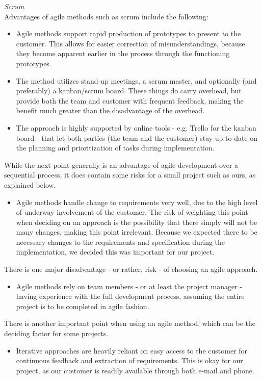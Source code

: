 \emph{Scrum} \\

Advantages of agile methods such as scrum include the following:
	\begin{itemize}
		\item Agile methods support rapid production of prototypes to present to the customer. This allows for easier correction of misunderstandings, because they become apparent earlier in the process through the functioning prototypes.
		\item The method utilizes stand-up meetings, a scrum master, and optionally (and preferably) a kanban/scrum board. These things do carry overhead, but provide both the team and customer with frequent feedback, making the benefit much greater than the disadvantage of the overhead.
		\item The approach is highly supported by online tools - e.g. Trello for the kanban board - that let both parties (the team and the customer) stay up-to-date on the planning and prioritization of tasks during implementation.
	\end{itemize}
While the next point generally is an advantage of agile development over a sequential process, it does contain some risks for a small project such as ours, as explained below.
	\begin{itemize}
		\item Agile methods handle change to requirements very well, due to the high level of underway involvement of the customer. The risk of weighting this point when deciding on an approach is the possibility that there simply will not be many changes, making this point irrelevant. Because we expected there to be necessary changes to the requirements and specification during the implementation, we decided this was important for our project.
	\end{itemize}
There is one major disadvantage - or rather, risk - of choosing an agile approach.
	\begin{itemize}
		\item Agile methods rely on team members - or at least the project manager - having experience with the full development process, assuming the entire project is to be completed in agile fashion.		
	\end{itemize}
There is another important point when using an agile method, which can be the deciding factor for some projects.
	\begin{itemize}
		\item Iterative approaches are heavily reliant on easy access to the customer for continuous feedback and extraction of requirements. This is okay for our project, as our customer is readily available through both e-mail and phone.
	\end{itemize}

